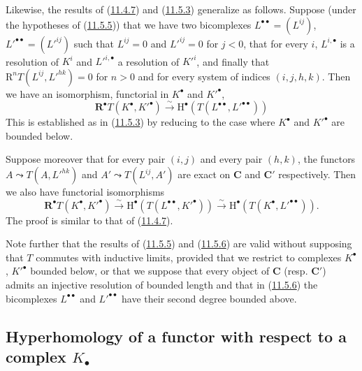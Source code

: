 \begin{env}[11.5.6]
\label{0.11.5.6}
Likewise, the results of (\hyperref[0.11.4.7]{11.4.7}) and
(\hyperref[0.11.5.3]{11.5.3}) generalize as follows. Suppose (under
the hypotheses of (\hyperref[0.11.5.5]{11.5.5})) that we have two
bicomplexes $L^{\bullet\bullet}=(L^{ij})$,
$L'^{\bullet\bullet}=(L'^{ij})$ such that $L^{ij}=0$ and $L'^{ij}=0$ for
$j<0$, that for every $i$, $L^{i,\bullet}$ is a resolution of $K^i$ and
$L'^{i,\bullet}$ a resolution of $K'^i$, and finally that
$\mathrm R^nT(L^{ij},L'^{hk})=0$ for $n>0$ and for every system of indices
$(i,j,h,k)$. Then we have an isomorphism, functorial in $K^\bullet$ and
$K'^\bullet$,
\[
  \label{0.11.5.6.1}
  \mathbf R^\bullet T(K^\bullet,K'^\bullet)\xrightarrow{\sim}
  \mathrm H^\bullet(T(L^{\bullet\bullet},L'^{\bullet\bullet}))
  \tag{11.5.6.1}
\]
This is established as in (\hyperref[0.11.5.3]{11.5.3}) by reducing to the
case where $K^\bullet$ and $K'^\bullet$ are bounded below.

Suppose moreover that for every pair $(i,j)$ and every pair $(h,k)$,
the functors $A\leadsto T(A,L'^{hk})$ and $A'\leadsto T(L^{ij},A')$ are
exact on $\boldsymbol{C}$ and $\boldsymbol{C}'$ respectively. Then we also have
functorial isomorphisms
\[
  \label{0.11.5.6.2}
  \mathbf R^\bullet T(K^\bullet,K'^\bullet)
  \xrightarrow{\sim}\mathrm H^\bullet(T(L^{\bullet\bullet},K'^\bullet))
  \xrightarrow{\sim}\mathrm H^\bullet(T(K^\bullet,L'^{\bullet\bullet})).
  \tag{11.5.6.2}
\]
The proof is similar to that of
(\hyperref[0.11.4.7]{11.4.7}).
\end{env}

\begin{env}[11.5.7]
\label{0.11.5.7}
Note further that the results of (\hyperref[0.11.5.5]{11.5.5}) and
(\hyperref[0.11.5.6]{11.5.6}) are valid without supposing that $T$ commutes
with inductive limits, provided that we restrict to complexes
$K^\bullet$, $K'^\bullet$ bounded below, or that we suppose that every
object of $\boldsymbol{C}$ (resp. $\boldsymbol{C}'$) admits an injective resolution of
bounded length and that in (\hyperref[0.11.5.6]{11.5.6}) the bicomplexes
$L^{\bullet\bullet}$ and $L'^{\bullet\bullet}$ have their second degree bounded
above.
\end{env}

\subsection{Hyperhomology of a functor with respect to a complex
$K_\bullet$}
\label{subsection:0.11.6}

